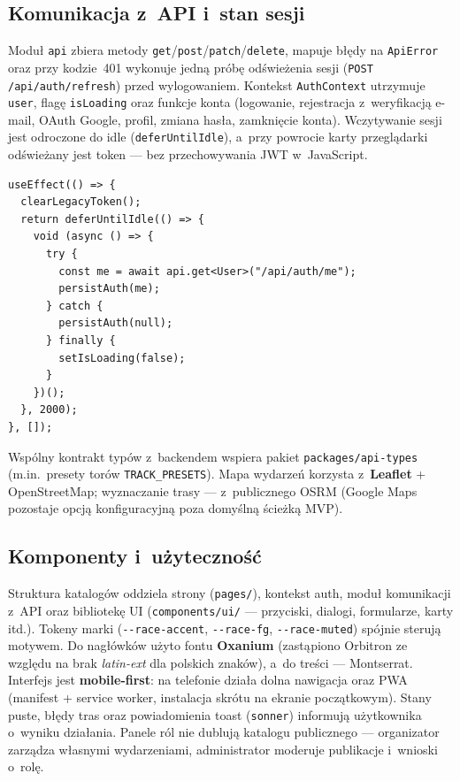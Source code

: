 \documentclass{sprz}
\begin{document}
\subsection*{Komunikacja z~API i~stan sesji}

Moduł \texttt{api} zbiera metody \texttt{get}/\texttt{post}/\texttt{patch}/\texttt{delete},
mapuje błędy na \texttt{ApiError} oraz przy kodzie~401 wykonuje jedną próbę
odświeżenia sesji (\texttt{POST /api/\allowbreak auth/\allowbreak refresh})
przed wylogowaniem.
Kontekst \texttt{AuthContext} utrzymuje \texttt{user}, flagę \texttt{isLoading}
oraz funkcje konta (logowanie, rejestracja z~weryfikacją e-mail,
OAuth Google, profil, zmiana hasła, zamknięcie konta).
Wczytywanie sesji jest odroczone do idle (\texttt{defer\-Until\-Idle}),
a~przy powrocie karty przeglądarki odświeżany jest token ---
bez przechowywania JWT w~JavaScript.

\begin{lstlisting}[caption={Wczytywanie sesji w~\texttt{AuthContext} (httpOnly cookies).}, label={lst:auth-bootstrap}]
useEffect(() => {
  clearLegacyToken();
  return deferUntilIdle(() => {
    void (async () => {
      try {
        const me = await api.get<User>("/api/auth/me");
        persistAuth(me);
      } catch {
        persistAuth(null);
      } finally {
        setIsLoading(false);
      }
    })();
  }, 2000);
}, []);
\end{lstlisting}

Wspólny kontrakt typów z~backendem wspiera pakiet
\texttt{packages/\allowbreak api-\allowbreak types}
(m.in.\ presety torów \texttt{TRACK\_PRESETS}).
Mapa wydarzeń korzysta z~\textbf{Leaflet} + OpenStreetMap;
wyznaczanie trasy --- z~publicznego OSRM
(Google Maps pozostaje opcją konfiguracyjną poza domyślną ścieżką MVP).

\subsection*{Komponenty i~użyteczność}

Struktura katalogów oddziela strony (\texttt{pages/}), kontekst auth, moduł komunikacji z~API oraz bibliotekę UI (\texttt{components/\allowbreak ui/} --- przyciski, dialogi, formularze, karty itd.). Tokeny marki (\texttt{{-{-}race-accent}}, \texttt{{-{-}race-fg}}, \texttt{{-{-}race-muted}}) spójnie sterują motywem. Do nagłówków użyto fontu \textbf{Oxanium} (zastąpiono Orbitron ze względu na brak \emph{latin-ext} dla polskich znaków), a~do treści --- Montserrat. Interfejs jest \textbf{mobile-first}: na telefonie działa dolna nawigacja oraz PWA (manifest + service worker, instalacja skrótu na ekranie początkowym). Stany puste, błędy tras oraz powiadomienia toast (\texttt{sonner}) informują użytkownika o~wyniku działania. Panele ról nie dublują katalogu publicznego --- organizator zarządza własnymi wydarzeniami, administrator moderuje publikacje i~wnioski o~rolę.
\end{document}
